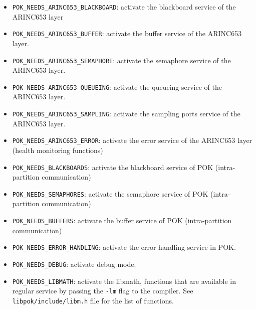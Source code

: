 \begin{itemize}
      \item
         \texttt{POK\_NEEDS\_ARINC653\_BLACKBOARD}: activate the blackboard
         service of the ARINC653 layer
      \item
         \texttt{POK\_NEEDS\_ARINC653\_BUFFER}:
         activate the buffer service of the ARINC653 layer.
      \item
         \texttt{POK\_NEEDS\_ARINC653\_SEMAPHORE}:
         activate the semaphore service of the ARINC653 layer.
      \item
         \texttt{POK\_NEEDS\_ARINC653\_QUEUEING}:
         activate the queueing service of the ARINC653 layer.
      \item
         \texttt{POK\_NEEDS\_ARINC653\_SAMPLING}:
         activate the sampling ports service of the ARINC653 layer.
      \item
         \texttt{POK\_NEEDS\_ARINC653\_ERROR}:
         activate the error service of the ARINC653 layer (health monitoring
         functions)
      \item
         \texttt{POK\_NEEDS\_BLACKBOARDS}:
         activate the blackboard service of POK (intra-partition communication)
      \item
         \texttt{POK\_NEEDS\_SEMAPHORES}:
         activate the semaphore service of POK (intra-partition communication)
      \item
         \texttt{POK\_NEEDS\_BUFFERS}:
         activate the buffer service of POK (intra-partition communication)
      \item
         \texttt{POK\_NEEDS\_ERROR\_HANDLING}:
         activate the error handling service in POK.
      \item
         \texttt{POK\_NEEDS\_DEBUG}:
         activate debug mode.
      \item
         \texttt{POK\_NEEDS\_LIBMATH}:
         activate the libmath, functions that are available in regular service
         by passing the \texttt{-lm} flag to the compiler. See
         \texttt{libpok/include/libm.h} file for the list of functions.
   \end{itemize}
